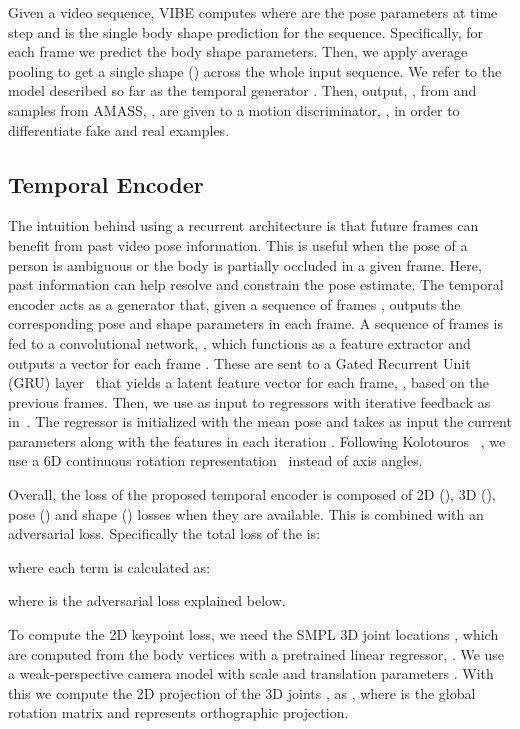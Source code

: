 \documentclass[10pt,twocolumn,letterpaper]{article}
\begin{document}
Given a video sequence, VIBE computes
 where  are the pose parameters at time step  and  is the single body shape prediction for the sequence. 
Specifically,  for each frame we predict the body shape parameters. Then, we apply average pooling to get a single shape () across the whole input sequence.
We refer to the model described so far as the temporal generator . 
Then, output, , from  and samples from AMASS, , are given to a motion discriminator, , in order to differentiate fake and real examples. 



 



\subsection{Temporal Encoder}
The intuition behind using a recurrent architecture is that future frames can benefit from past video pose information. This is useful when the pose of a person is ambiguous or the body is partially occluded in a given frame. Here, past information can help resolve and constrain the pose estimate. The temporal encoder acts as a generator that, given a sequence of frames , outputs the corresponding pose and shape parameters in each frame. A sequence of  frames is fed to a convolutional network, , which functions as a feature extractor and outputs a vector  for each frame .
These are sent to a Gated Recurrent Unit (GRU) layer~\cite{gru} that yields a latent feature vector  for each frame, , based on the previous frames.
Then, we use  as input to  regressors with iterative feedback as in~\cite{kanazawa_hmr}. The regressor is initialized with the mean pose  and takes as input the current parameters  along with the features  in each iteration . Following Kolotouros \etal~\cite{SPIN:ICCV:2019}, we use a 6D continuous rotation representation~\cite{Zhou_2019_CVPR} instead of axis angles. 

Overall, the loss of the proposed temporal encoder is composed of 2D (), 3D (), pose () and shape () losses when they are available. This is combined with an adversarial  loss. Specifically the total loss of the  is: 


where each term is calculated as:

where  is the adversarial loss explained below. 

To compute the 2D keypoint loss, we need the SMPL 3D joint locations , which are computed from the body vertices with a pretrained linear regressor, .
We use a weak-perspective camera model with scale and translation parameters .
With this we compute the 2D projection of the 3D joints , as
, where  is the global rotation matrix and  represents orthographic projection.
\end{document}
